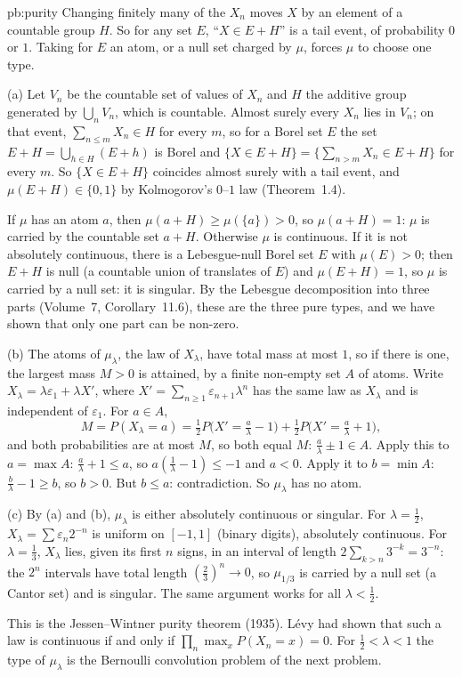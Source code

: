 \begin{solution}{pb:purity}
\idea Changing finitely many of the $X_n$ moves $X$ by an element of a countable group $H$. So for any set $E$, ``$X\in E+H$'' is a tail event, of probability $0$ or $1$.
Taking for $E$ an atom, or a null set charged by $\mu$, forces $\mu$ to choose one type.

\writeup (a) Let $V_n$ be the countable set of values of $X_n$ and $H$ the additive group generated by $\bigcup_nV_n$, which is countable. Almost surely every $X_n$ lies
in $V_n$; on that event, $\sum_{n\le m}X_n\in H$ for every $m$, so for a Borel set $E$ the set $E+H=\bigcup_{h\in H}(E+h)$ is Borel and
$\{X\in E+H\}=\bigl\{\sum_{n>m}X_n\in E+H\bigr\}$ for every $m$. So $\{X\in E+H\}$ coincides almost surely with a tail event, and $\mu(E+H)\in\{0,1\}$ by Kolmogorov's $0$--$1$
law (Theorem~1.4).

If $\mu$ has an atom $a$, then $\mu(a+H)\ge\mu(\{a\})>0$, so $\mu(a+H)=1$: $\mu$ is carried by the countable set $a+H$. Otherwise $\mu$ is continuous. If it is not absolutely
continuous, there is a Lebesgue-null Borel set $E$ with $\mu(E)>0$; then $E+H$ is null (a countable union of translates of $E$) and $\mu(E+H)=1$, so $\mu$ is carried by a
null set: it is singular. By the Lebesgue decomposition into three parts (Volume~7, Corollary~11.6), these are the three pure types, and we have shown that only one part can
be non-zero.

(b) The atoms of $\mu_\lambda$, the law of $X_\lambda$, have total mass at most $1$, so if there is one, the largest mass $M>0$ is attained, by a finite non-empty set $A$
of atoms. Write $X_\lambda=\lambda\varepsilon_1+\lambda X'$, where $X'=\sum_{n\ge1}\varepsilon_{n+1}\lambda^n$ has the same law as $X_\lambda$ and is independent of $\varepsilon_1$. For
$a\in A$,
\[
M=P(X_\lambda=a)=\tfrac12P\bigl(X'=\tfrac a\lambda-1\bigr)+\tfrac12P\bigl(X'=\tfrac a\lambda+1\bigr),
\]
and both probabilities are at most $M$, so both equal $M$: $\frac a\lambda\pm1\in A$. Apply this to $a=\max A$: $\frac a\lambda+1\le a$, so $a(\frac1\lambda-1)\le-1$ and $a<0$. Apply it to
$b=\min A$: $\frac b\lambda-1\ge b$, so $b>0$. But $b\le a$: contradiction. So $\mu_\lambda$ has no atom.

(c) By (a) and (b), $\mu_\lambda$ is either absolutely continuous or singular. For $\lambda=\frac12$, $X_\lambda=\sum\varepsilon_n2^{-n}$ is uniform on $[-1,1]$ (binary digits),
absolutely continuous. For $\lambda=\frac13$, $X_\lambda$ lies, given its first $n$ signs, in an interval of length $2\sum_{k>n}3^{-k}=3^{-n}$: the $2^n$ intervals have total length
$(\frac23)^n\to0$, so $\mu_{1/3}$ is carried by a null set (a Cantor set) and is singular. The same argument works for all $\lambda<\frac12$.

\leads This is the Jessen--Wintner purity theorem (1935). Lévy had shown that such a law is continuous if and only if $\prod_n\max_xP(X_n=x)=0$. For $\frac12<\lambda<1$
the type of $\mu_\lambda$ is the Bernoulli convolution problem of the next problem.
\end{solution}

